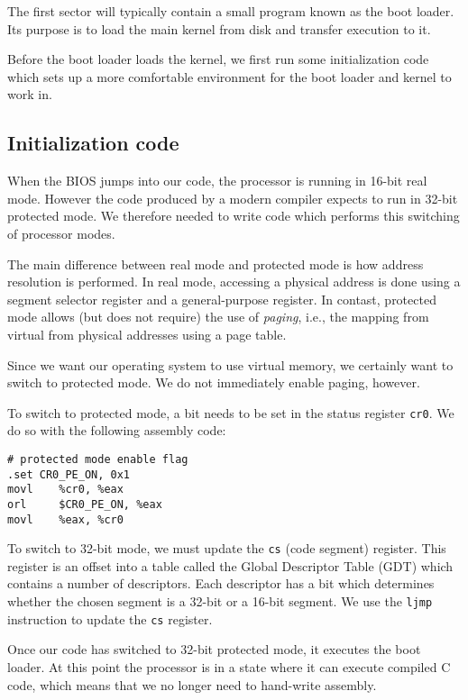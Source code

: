 \documentclass{article}
\begin{document}
The first sector will typically contain a small program known as the boot
loader. Its purpose is to load the main kernel from disk and transfer
execution to it.

Before the boot loader loads the kernel, we first run some initialization code
which sets up a more comfortable environment for the boot loader and kernel to
work in.



\subsection*{Initialization code}
When the BIOS jumps into our code, the processor is running in 16-bit real
mode. However the code produced by a modern compiler expects to run in 32-bit
protected mode. We therefore needed to write code which performs this
switching of processor modes.

The main difference between real mode and protected mode is how address
resolution is performed. In real mode, accessing a physical address is done
using a segment selector register and a general-purpose register. In
contast, protected mode allows (but does not require) the use of
\emph{paging}, i.e., the mapping from virtual from physical addresses using a
page table.

Since we want our operating system to use virtual memory, we certainly want to
switch to protected mode. We do not immediately enable paging, however.

To switch to protected mode, a bit needs to be set in the status register
\texttt{cr0}. We do so with the following assembly code:
\begin{verbatim}
# protected mode enable flag
.set CR0_PE_ON, 0x1 
movl    %cr0, %eax
orl     $CR0_PE_ON, %eax
movl    %eax, %cr0
\end{verbatim}

To switch to 32-bit mode, we must update the \texttt{cs} (code
segment) register. This register is an offset into a table called the Global
Descriptor Table (GDT) which contains a number of descriptors. Each descriptor
has a bit which determines whether the chosen segment is a 32-bit or a 16-bit
segment. We use the \texttt{ljmp} instruction to update the \texttt{cs}
register.

Once our code has switched to 32-bit protected mode, it executes the boot
loader. At this point the processor is in a state where it can execute
compiled C code, which means that we no longer need to hand-write assembly.
\end{document}
